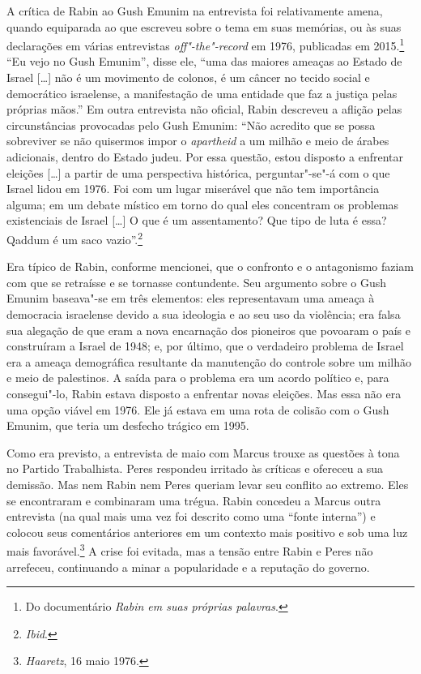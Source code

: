 A crítica de Rabin ao Gush Emunim na entrevista foi relativamente amena,
quando equiparada ao que escreveu sobre o tema em suas memórias, ou às
suas declarações em várias entrevistas \textit{off"-the"-record} em 1976, 
publicadas em 2015.\footnote{Do documentário \textit{Rabin em suas próprias palavras}.} ``Eu vejo no Gush Emunim'', disse
ele, ``uma das maiores ameaças ao Estado de Israel {[}\ldots{}{]} não é um movimento
de colonos, é um câncer no tecido social e democrático israelense, a
manifestação de uma entidade que faz a justiça pelas próprias mãos.'' Em
outra entrevista não oficial, Rabin descreveu a aflição pelas
circunstâncias provocadas pelo Gush Emunim: ``Não acredito que se possa
sobreviver se não quisermos impor o \textit{apartheid} a um milhão e meio
de árabes adicionais, dentro do Estado judeu. Por essa questão, estou
disposto a enfrentar eleições {[}\ldots{}{]} a partir de uma perspectiva histórica,
perguntar"-se"-á com o que Israel lidou em 1976. Foi com um lugar
miserável que não tem importância alguma; em um debate místico em torno
do qual eles concentram os problemas existenciais de Israel {[}\ldots{}{]} O que é um
assentamento? Que tipo de luta é essa? Qaddum é um saco
vazio''.\footnote{\textit{Ibid}.}

Era típico de Rabin, conforme mencionei, que o confronto e o antagonismo
faziam com que se retraísse e se tornasse contundente. Seu argumento
sobre o Gush Emunim baseava"-se em três elementos: eles representavam
uma ameaça à democracia israelense devido a sua ideologia e ao seu uso
da violência; era falsa sua alegação de que eram a nova encarnação
dos pioneiros que povoaram o país e construíram a Israel de 1948; e, por
último, que o verdadeiro problema de Israel era a ameaça demográfica
resultante da manutenção do controle sobre um milhão e meio de
palestinos. A saída para o problema era um acordo político e, para
consegui"-lo, Rabin estava disposto a enfrentar novas eleições. Mas essa
não era uma opção viável em 1976. Ele já estava em uma rota de colisão
com o Gush Emunim, que teria um desfecho trágico em 1995.

Como era previsto, a entrevista de maio com Marcus trouxe as
questões à tona no Partido Trabalhista. Peres respondeu irritado às
críticas e ofereceu a sua demissão. Mas nem Rabin nem Peres queriam
levar seu conflito ao extremo. Eles se encontraram e combinaram uma
trégua. Rabin concedeu a Marcus outra entrevista (na qual mais uma vez
foi descrito como uma ``fonte interna'') e colocou seus comentários
anteriores em um contexto mais positivo e sob uma luz mais
favorável.\footnote{\textit{Haaretz}, 16 maio 1976.} A crise foi evitada, mas a tensão entre Rabin e
Peres não arrefeceu, continuando a minar a popularidade e a reputação do
governo.

